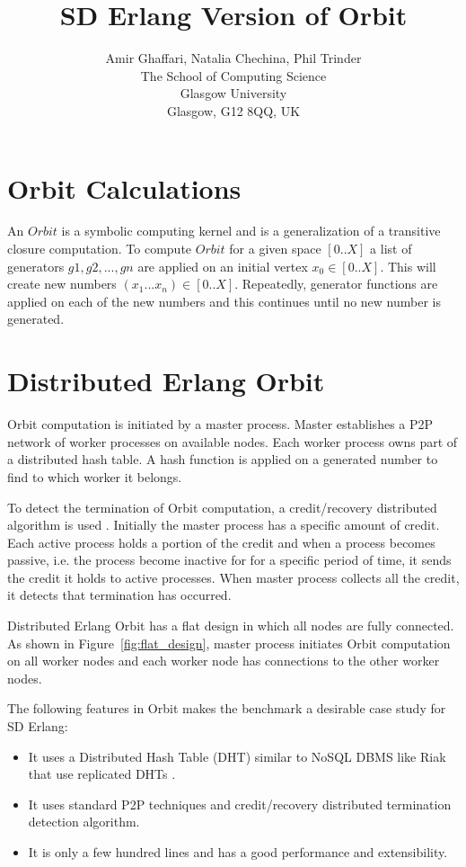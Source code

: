 \documentclass[11pt,a4paper]{article}
\title{\Large \bf SD Erlang Version of Orbit}
\author{ Amir Ghaffari, Natalia Chechina, Phil Trinder
\\The School of Computing Science
\\  Glasgow University
\\Glasgow, G12 8QQ, UK}
\begin{document}
\maketitle
\thispagestyle{empty}
\thispagestyle{empty}
\setcounter{page}{1}

\pagestyle{fancy}
\rhead{\footnotesize \parbox{11cm}{} }


\section{Orbit Calculations}

An $Orbit$ is a symbolic computing kernel and is a generalization of a transitive closure computation\cite{Lubeck2001}. To compute $Orbit$ for a given space $[0..X]$  a list of generators $g1, g2,..., gn$ are applied on an initial vertex $x_{0}\in [0..X]$.  This will create new numbers $(x_{1}...x_{n}) \in [0..X]$. Repeatedly, generator functions are applied on each of the new numbers and this continues until no new number is generated.

\section{Distributed Erlang Orbit}

Orbit computation is initiated by a master process. Master establishes a P2P network of worker processes on available nodes. Each worker process owns part of a distributed hash table. A hash function is applied on a generated number to find to which worker it belongs.

To detect the termination of Orbit computation, a credit/recovery distributed algorithm is used \cite{Matocha1998}. Initially the master process has a specific amount of credit. Each active process holds a portion of the credit and when a process becomes passive, i.e. the process become inactive for for a specific period of time, it sends the credit it holds to active processes. When master process collects all the credit, it detects that termination has occurred.

Distributed Erlang Orbit has a flat design in which all nodes are fully connected. As shown in Figure~\ref{fig:flat_design}, master process initiates Orbit computation on all worker nodes and each worker node has connections to the other worker nodes.

The following features in Orbit makes the benchmark a desirable case study for SD Erlang:
\begin{itemize}
  \item It uses a Distributed Hash Table (DHT) similar to NoSQL DBMS like Riak that use replicated DHTs \cite{BashoConcepts2013}.
  \item It uses standard P2P techniques and credit/recovery distributed termination detection algorithm.
  \item It is only a few hundred lines and has a  good performance and extensibility.
\end{itemize}
\end{document}
